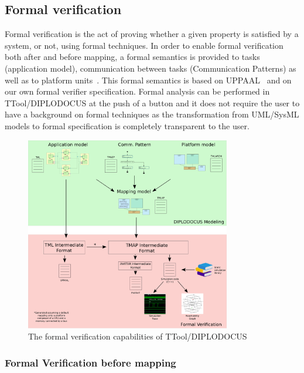 \documentclass{llncs}
\begin{document}
\subsection{Formal verification}
\label{subsec:FormalVerif}
%
Formal verification is the act of proving whether a given property is satisfied by a system, or not, using formal
techniques. In order to enable formal verification both after and before mapping, a formal semantics is provided to
tasks (application model), communication between tasks (Communication Patterns) as well as to platform
units~\cite{Knorreck09}\cite{Knorreck11}. This formal semantics is based  on UPPAAL~\cite{UPPAAL} and on our own formal verifier specification. Formal analysis can be performed in TTool/DIPLODOCUS at the push of a button and it does
not require the user to have a background on formal techniques as the transformation from UML/SysML models to formal specification is completely transparent to the user.\\
%
\begin{figure}[!htbp]
	\centering
	\includegraphics[width=0.8\textwidth]{figures/FV.pdf}
	\caption{The formal verification capabilities of TTool/DIPLODOCUS}
	\label{fig:FV}
\end{figure}
%
\subsubsection{Formal Verification before mapping}
\end{document}
